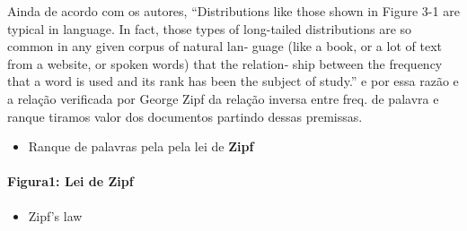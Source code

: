 \documentclass[]{article}
\newenvironment{Shaded}{\begin{snugshade}}{\end{snugshade}}
\newcommand{\CommentTok}[1]{\textcolor[rgb]{0.56,0.35,0.01}{\textit{#1}}}
\newcommand{\DataTypeTok}[1]{\textcolor[rgb]{0.13,0.29,0.53}{#1}}
\newcommand{\FloatTok}[1]{\textcolor[rgb]{0.00,0.00,0.81}{#1}}
\newcommand{\KeywordTok}[1]{\textcolor[rgb]{0.13,0.29,0.53}{\textbf{#1}}}
\newcommand{\NormalTok}[1]{#1}
\newcommand{\OperatorTok}[1]{\textcolor[rgb]{0.81,0.36,0.00}{\textbf{#1}}}
\newcommand{\OtherTok}[1]{\textcolor[rgb]{0.56,0.35,0.01}{#1}}
\newcommand{\StringTok}[1]{\textcolor[rgb]{0.31,0.60,0.02}{#1}}
\providecommand{\tightlist}{%
  \setlength{\itemsep}{0pt}\setlength{\parskip}{0pt}}
\let\oldparagraph\paragraph
\renewcommand{\paragraph}[1]{\oldparagraph{#1}\mbox{}}
\begin{document}
Ainda de acordo com os autores, ``Distributions like those shown in
Figure 3-1 are typical in language. In fact, those types of long-tailed
distributions are so common in any given corpus of natural lan‐ guage
(like a book, or a lot of text from a website, or spoken words) that the
relation‐ ship between the frequency that a word is used and its rank
has been the subject of study.'' e por essa razão e a relação verificada
por George Zipf da relação inversa entre freq. de palavra e ranque
tiramos valor dos documentos partindo dessas premissas.

\begin{itemize}
\tightlist
\item
  Ranque de palavras pela pela lei de \textbf{Zipf}
\end{itemize}

\begin{Shaded}
\end{Shaded}

\hypertarget{figura1-lei-de-zipf}{%
\paragraph{Figura1: Lei de Zipf}\label{figura1-lei-de-zipf}}

\begin{itemize}
\tightlist
\item
  Zipf's law
\end{itemize}

\begin{Shaded}
\end{Shaded}
\end{document}
